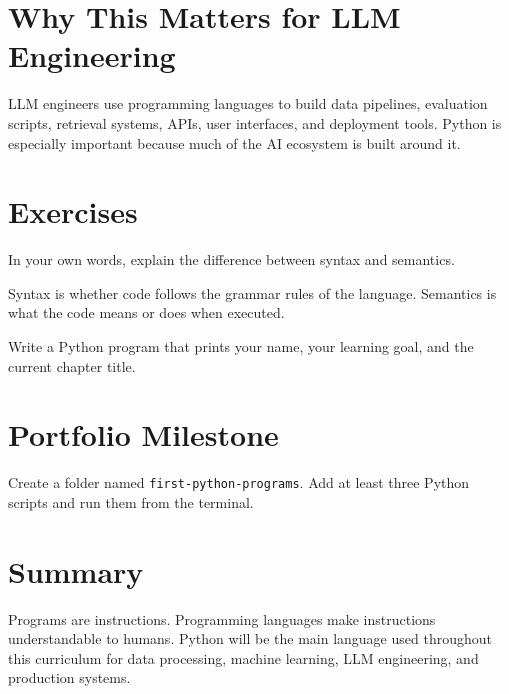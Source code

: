 \section{Why This Matters for LLM Engineering}

LLM engineers use programming languages to build data pipelines, evaluation scripts, retrieval systems, APIs, user interfaces, and deployment tools. Python is especially important because much of the AI ecosystem is built around it.

\section{Exercises}

\begin{exercise}
In your own words, explain the difference between syntax and semantics.
\end{exercise}

\begin{solution}
Syntax is whether code follows the grammar rules of the language. Semantics is what the code means or does when executed.
\end{solution}

\begin{exercise}
Write a Python program that prints your name, your learning goal, and the current chapter title.
\end{exercise}

\section{Portfolio Milestone}

Create a folder named \texttt{first-python-programs}. Add at least three Python scripts and run them from the terminal.

\section{Summary}

Programs are instructions. Programming languages make instructions understandable to humans. Python will be the main language used throughout this curriculum for data processing, machine learning, LLM engineering, and production systems.
